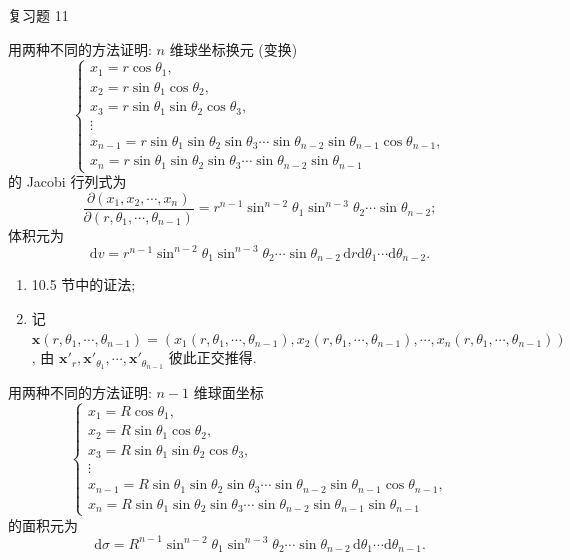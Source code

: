 
\begin{exblock}{复习题 11}
\item 用两种不同的方法证明: $n$ 维球坐标换元 (变换)
\[
\begin{cases}
x_{1}=r\cos\theta_{1},\\
x_{2}=r\sin\theta_{1}\cos\theta_{2},\\
x_{3}=r\sin\theta_{1}\sin\theta_{2}\cos\theta_{3},\\
\vdots\\
x_{n-1}=r\sin\theta_{1}\sin\theta_{2}\sin\theta_{3}\cdots\sin\theta_{n-2}\sin\theta_{n-1}\cos\theta_{n-1},\\
x_{n}=r\sin\theta_{1}\sin\theta_{2}\sin\theta_{3}\cdots\sin\theta_{n-2}\sin\theta_{n-1}
\end{cases}
\]
的 Jacobi 行列式为
\[
\frac{\partial(x_{1},x_{2},\cdots,x_{n})}{\partial(r,\theta_{1},\cdots,\theta_{n-1})}=r^{n-1}\sin^{n-2}\theta_{1}\sin^{n-3}\theta_{2}\cdots\sin\theta_{n-2};
\]
体积元为
\[
\mathrm{d}v=r^{n-1}\sin^{n-2}\theta_{1}\sin^{n-3}\theta_{2}\cdots\sin\theta_{n-2}\,\mathrm{d}r\mathrm{d}\theta_{1}\cdots\mathrm{d}\theta_{n-2}.
\]

  \begin{enumerate}[label=(\arabic*),leftmargin=2.6em,itemsep=0.15\baselineskip,topsep=0.2\baselineskip]

  \item 10.5 节中的证法;

  \item 记 $\boldsymbol{x}(r,\theta_{1},\cdots,\theta_{n-1})=(x_{1}(r,\theta_{1},\cdots,\theta_{n-1}),x_{2}(r,\theta_{1},\cdots,\theta_{n-1}),\cdots,x_{n}(r,\theta_{1},\cdots,\theta_{n-1}))$, 由 $\boldsymbol{x}'_{r},\boldsymbol{x}'_{\theta_{1}},\cdots,\boldsymbol{x}'_{\theta_{n-1}}$ 彼此正交推得.

  \end{enumerate}

\item 用两种不同的方法证明: $n-1$ 维球面坐标
\[
\begin{cases}
x_{1}=R\cos\theta_{1},\\
x_{2}=R\sin\theta_{1}\cos\theta_{2},\\
x_{3}=R\sin\theta_{1}\sin\theta_{2}\cos\theta_{3},\\
\vdots\\
x_{n-1}=R\sin\theta_{1}\sin\theta_{2}\sin\theta_{3}\cdots\sin\theta_{n-2}\sin\theta_{n-1}\cos\theta_{n-1},\\
x_{n}=R\sin\theta_{1}\sin\theta_{2}\sin\theta_{3}\cdots\sin\theta_{n-2}\sin\theta_{n-1}\sin\theta_{n-1}
\end{cases}
\]
的面积元为
\[
\mathrm{d}\sigma=R^{n-1}\sin^{n-2}\theta_{1}\sin^{n-3}\theta_{2}\cdots\sin\theta_{n-2}\,\mathrm{d}\theta_{1}\cdots\mathrm{d}\theta_{n-1}.
\]


\end{exblock}
